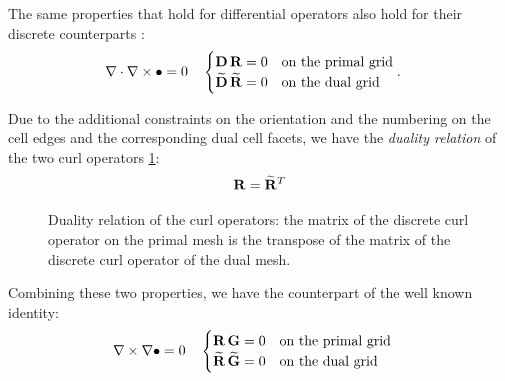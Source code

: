 The same properties that hold for differential operators also hold
for their discrete counterparts \cite{schuhmann_nonorthogonal}:
\begin{align*}
  {\nabla\cdot {\nabla\times \bullet}} & = 0 && \begin{cases}
  {\mathbf{D}\,\mathbf{R}} = 0 & \text{on the primal grid} \\ 
  {\widetilde{\mathbf{D}}\,\widetilde{\mathbf{R}}} = 0 & \text{on the dual grid}
  \end{cases}.
\end{align*}

Due to the additional constraints on the orientation and the numbering
on the cell edges and the corresponding dual cell facets, we have the
\emph{duality relation} of the two curl operators \ref{fig:duality_curl}:
\begin{equation*}
  \mathbf{R} = {\widetilde{\mathbf{R}}}^T
\end{equation*}

\begin{figure}[htbp]
  \begin{center}
    \resizebox{8cm}{!}{}
  \end{center}
  \caption{Duality relation of the curl operators: the matrix of the
    discrete curl operator on the primal mesh is the transpose of the
    matrix of the discrete curl operator of the dual mesh.}  
  \label{fig:duality_curl}
\end{figure}

Combining these two properties, we have the counterpart of the well known
identity:
\begin{align*}
  {\nabla\times {\nabla\bullet}} & = 0 && \begin{cases}
    {\mathbf{R}\,\mathbf{G}} = 0 & \text{on the primal grid} \\
    {\widetilde{\mathbf{R}}\,\widetilde{\mathbf{G}}} = 0 & \text{on the dual grid}
  \end{cases}
\end{align*}

